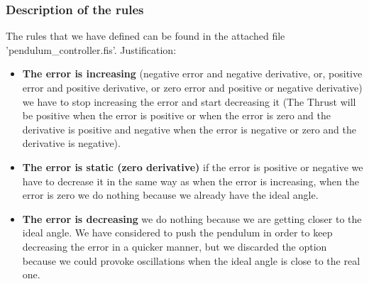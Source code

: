 \documentclass{article}[11pt]
\begin{document}
\subsubsection*{Description of the rules}
The rules that we have defined can be found in the attached file 'pendulum\_controller.fis'.
\break
Justification:
\begin{itemize}
    \item \textbf{The error is increasing} (negative error and negative derivative, or, positive error and positive derivative, or zero error and positive or negative derivative) we have to stop increasing the error and start decreasing it (The Thrust will be positive when the error is positive or when the error is zero and the derivative is positive and negative when the error is negative or zero and the derivative is negative).
     \item \textbf{The error is static (zero derivative)} if the error is positive or negative we have to decrease it in the same way as when the error is increasing, when the error is zero we do nothing because we already have the ideal angle.
     \item \textbf{The error is decreasing} we do nothing because we are getting closer to the ideal angle. We have considered to push the pendulum in order to keep decreasing the error in a quicker manner, but we discarded the option because we could provoke oscillations when the ideal angle is close to the real one.
\end{itemize}
\end{document}

